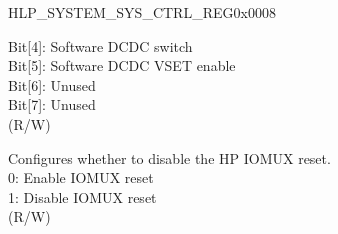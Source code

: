 \begin{register}{H}{LP\_SYSTEM\_SYS\_CTRL\_REG}{0x0008}
\begin{regdesc}
\begin{reglist}
Bit[4]: Software DCDC switch\\
Bit[5]: Software DCDC VSET enable\\
Bit[6]: Unused\\
Bit[7]: Unused\\
(R/W)
\label{fielddesc:LPSYSTEMIOMUXRESETDISABLE}\item [LP\_SYSTEM\_IO\_MUX\_RESET\_DISABLE] Configures whether to disable the HP IOMUX reset.\\
0: Enable IOMUX reset\\
1: Disable IOMUX reset\\
(R/W)
\item [Continued on the next page...]
\end{reglist}\end{regdesc}
\end{register}
\addtocounter{Regfloat}{-1}


